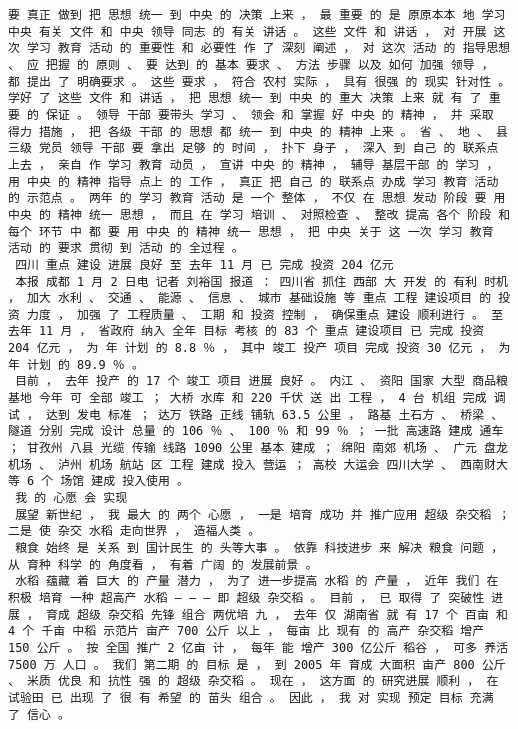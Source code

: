 \documentclass{article}
\begin{document}
\begin{Verbatim}[commandchars=\\\{\}]
 要 真正 做到 把 思想 统一 到 中央 的 决策 上来 ， 最 重要 的 是 原原本本 地 学习 中央 有关 文件 和 中央 领导 同志 的 有关 讲话 。 这些 文件 和 讲话 ， 对 开展 这次 学习 教育 活动 的 重要性 和 必要性 作 了 深刻 阐述 ， 对 这次 活动 的 指导思想 、 应 把握 的 原则 、 要 达到 的 基本 要求 、 方法 步骤 以及 如何 加强 领导 ， 都 提出 了 明确要求 。 这些 要求 ， 符合 农村 实际 ， 具有 很强 的 现实 针对性 。 学好 了 这些 文件 和 讲话 ， 把 思想 统一 到 中央 的 重大 决策 上来 就 有 了 重要 的 保证 。 领导 干部 要带头 学习 、 领会 和 掌握 好 中央 的 精神 ， 并 采取 得力 措施 ， 把 各级 干部 的 思想 都 统一 到 中央 的 精神 上来 。 省 、 地 、 县 三级 党员 领导 干部 要 拿出 足够 的 时间 ， 扑下 身子 ， 深入 到 自己 的 联系点 上去 ， 亲自 作 学习 教育 动员 ， 宣讲 中央 的 精神 ， 辅导 基层干部 的 学习 ， 用 中央 的 精神 指导 点上 的 工作 ， 真正 把 自己 的 联系点 办成 学习 教育 活动 的 示范点 。 两年 的 学习 教育 活动 是 一个 整体 ， 不仅 在 思想 发动 阶段 要 用 中央 的 精神 统一 思想 ， 而且 在 学习 培训 、 对照检查 、 整改 提高 各个 阶段 和 每个 环节 中 都 要 用 中央 的 精神 统一 思想 ， 把 中央 关于 这 一次 学习 教育 活动 的 要求 贯彻 到 活动 的 全过程 。 
 四川 重点 建设 进展 良好 至 去年 11 月 已 完成 投资 204 亿元 
 本报 成都 1 月 2 日电 记者 刘裕国 报道 ： 四川省 抓住 西部 大 开发 的 有利 时机 ， 加大 水利 、 交通 、 能源 、 信息 、 城市 基础设施 等 重点 工程 建设项目 的 投资 力度 ， 加强 了 工程质量 、 工期 和 投资 控制 ， 确保重点 建设 顺利进行 。 至 去年 11 月 ， 省政府 纳入 全年 目标 考核 的 83 个 重点 建设项目 已 完成 投资 204 亿元 ， 为 年 计划 的 8.8 ％ ， 其中 竣工 投产 项目 完成 投资 30 亿元 ， 为 年 计划 的 89.9 ％ 。 
 目前 ， 去年 投产 的 17 个 竣工 项目 进展 良好 。 内江 、 资阳 国家 大型 商品粮 基地 今年 可 全部 竣工 ； 大桥 水库 和 220 千伏 送 出 工程 ， 4 台 机组 完成 调试 ， 达到 发电 标准 ； 达万 铁路 正线 铺轨 63.5 公里 ， 路基 土石方 、 桥梁 、 隧道 分别 完成 设计 总量 的 106 ％ 、 100 ％ 和 99 ％ ； 一批 高速路 建成 通车 ； 甘孜州 八县 光缆 传输 线路 1090 公里 基本 建成 ； 绵阳 南郊 机场 、 广元 盘龙 机场 、 泸州 机场 航站 区 工程 建成 投入 营运 ； 高校 大运会 四川大学 、 西南财大 等 6 个 场馆 建成 投入使用 。 
 我 的 心愿 会 实现 
 展望 新世纪 ， 我 最大 的 两个 心愿 ， 一是 培育 成功 并 推广应用 超级 杂交稻 ； 二是 使 杂交 水稻 走向世界 ， 造福人类 。 
 粮食 始终 是 关系 到 国计民生 的 头等大事 。 依靠 科技进步 来 解决 粮食 问题 ， 从 育种 科学 的 角度看 ， 有着 广阔 的 发展前景 。 
 水稻 蕴藏 着 巨大 的 产量 潜力 ， 为了 进一步提高 水稻 的 产量 ， 近年 我们 在 积极 培育 一种 超高产 水稻 — — — 即 超级 杂交稻 。 目前 ， 已 取得 了 突破性 进展 ， 育成 超级 杂交稻 先锋 组合 两优培 九 ， 去年 仅 湖南省 就 有 17 个 百亩 和 4 个 千亩 中稻 示范片 亩产 700 公斤 以上 ， 每亩 比 现有 的 高产 杂交稻 增产 150 公斤 。 按 全国 推广 2 亿亩 计 ， 每年 能 增产 300 亿公斤 稻谷 ， 可多 养活 7500 万 人口 。 我们 第二期 的 目标 是 ， 到 2005 年 育成 大面积 亩产 800 公斤 、 米质 优良 和 抗性 强 的 超级 杂交稻 。 现在 ， 这方面 的 研究进展 顺利 ， 在 试验田 已 出现 了 很 有 希望 的 苗头 组合 。 因此 ， 我 对 实现 预定 目标 充满 了 信心 。 

\end{Verbatim}
\end{document}
